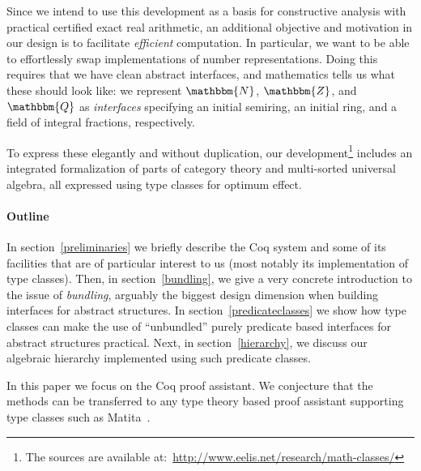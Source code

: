 \documentclass[a4paper,10pt,runningheads]{llncs}
\newcommand{\N}{\ensuremath{\mathbbm{N}}}
\newcommand{\Z}{\ensuremath{\mathbbm{Z}}}
\newcommand{\Q}{\ensuremath{\mathbbm{Q}}}
\begin{document}
Since we intend to use this development as a basis for constructive analysis with practical certified exact real arithmetic, an additional objective and motivation in our design is to facilitate \emph{efficient} computation. In particular, we want to be able to effortlessly swap implementations of number representations. Doing this requires that we have clean abstract interfaces, and mathematics tells us what these should look like: we represent $\N$, $\Z$, and $\Q$ as \emph{interfaces} specifying an initial semiring, an initial ring, and a field of integral fractions, respectively.

To express these elegantly and without duplication, our development\footnote{The sources are available
at:~\url{http://www.eelis.net/research/math-classes/}} includes an integrated formalization of parts of category theory and multi-sorted universal algebra, all expressed using type classes for optimum effect.


\paragraph{Outline}
In section~\ref{preliminaries} we briefly describe the Coq system and some of its facilities that are of particular interest to us (most notably its implementation of type classes). Then, in section~\ref{bundling}, we give a very concrete introduction to the issue of \emph{bundling}, arguably the biggest design dimension when building interfaces for abstract structures. In section~\ref{predicateclasses} we show how type classes can make the use of ``unbundled'' purely predicate based interfaces for abstract structures practical. Next, in section~\ref{hierarchy}, we discuss our algebraic hierarchy implemented using such predicate classes.





In this paper we focus on the Coq proof assistant. We conjecture that the methods can be transferred
to any type theory based proof assistant supporting type classes such as
Matita~\cite{asperti2007user}.
\end{document}
